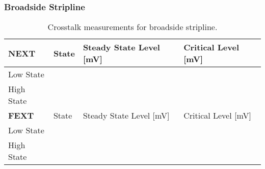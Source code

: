 \documentclass[../main.tex]{subfiles}
\begin{document}
\subsubsection{Broadside Stripline}

\begin{table}[h]
    \centering
    \begin{tabular}{l|l l l}
        \toprule[1pt]
        \textbf{NEXT} & State & Steady State Level [mV] & Critical Level [mV] \\
        \midrule
        Low State & & & \\
        High State & & & \\
        \midrule[1pt]
        \textbf{FEXT} & State & Steady State Level [mV] & Critical Level [mV] \\
        \midrule
        Low State & & & \\
        High State & & & \\
        \bottomrule[1pt]
    \end{tabular}
    \caption{Crosstalk measurements for broadside stripline.}
    \label{tab:sim-broadside-stripline}
\end{table}
\end{document}
